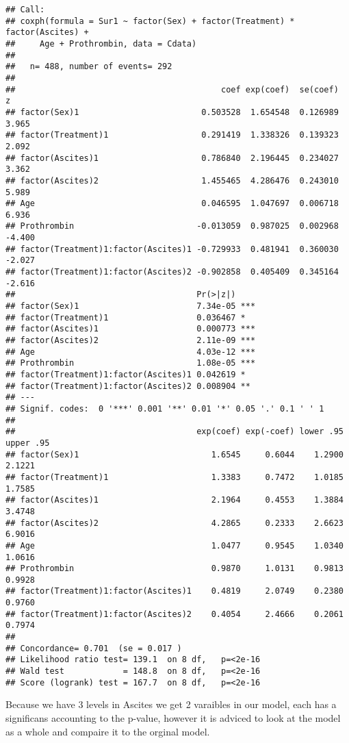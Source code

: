 \documentclass[
]{article}
\begin{document}
\begin{verbatim}
## Call:
## coxph(formula = Sur1 ~ factor(Sex) + factor(Treatment) * factor(Ascites) + 
##     Age + Prothrombin, data = Cdata)
## 
##   n= 488, number of events= 292 
## 
##                                          coef exp(coef)  se(coef)      z
## factor(Sex)1                         0.503528  1.654548  0.126989  3.965
## factor(Treatment)1                   0.291419  1.338326  0.139323  2.092
## factor(Ascites)1                     0.786840  2.196445  0.234027  3.362
## factor(Ascites)2                     1.455465  4.286476  0.243010  5.989
## Age                                  0.046595  1.047697  0.006718  6.936
## Prothrombin                         -0.013059  0.987025  0.002968 -4.400
## factor(Treatment)1:factor(Ascites)1 -0.729933  0.481941  0.360030 -2.027
## factor(Treatment)1:factor(Ascites)2 -0.902858  0.405409  0.345164 -2.616
##                                     Pr(>|z|)    
## factor(Sex)1                        7.34e-05 ***
## factor(Treatment)1                  0.036467 *  
## factor(Ascites)1                    0.000773 ***
## factor(Ascites)2                    2.11e-09 ***
## Age                                 4.03e-12 ***
## Prothrombin                         1.08e-05 ***
## factor(Treatment)1:factor(Ascites)1 0.042619 *  
## factor(Treatment)1:factor(Ascites)2 0.008904 ** 
## ---
## Signif. codes:  0 '***' 0.001 '**' 0.01 '*' 0.05 '.' 0.1 ' ' 1
## 
##                                     exp(coef) exp(-coef) lower .95 upper .95
## factor(Sex)1                           1.6545     0.6044    1.2900    2.1221
## factor(Treatment)1                     1.3383     0.7472    1.0185    1.7585
## factor(Ascites)1                       2.1964     0.4553    1.3884    3.4748
## factor(Ascites)2                       4.2865     0.2333    2.6623    6.9016
## Age                                    1.0477     0.9545    1.0340    1.0616
## Prothrombin                            0.9870     1.0131    0.9813    0.9928
## factor(Treatment)1:factor(Ascites)1    0.4819     2.0749    0.2380    0.9760
## factor(Treatment)1:factor(Ascites)2    0.4054     2.4666    0.2061    0.7974
## 
## Concordance= 0.701  (se = 0.017 )
## Likelihood ratio test= 139.1  on 8 df,   p=<2e-16
## Wald test            = 148.8  on 8 df,   p=<2e-16
## Score (logrank) test = 167.7  on 8 df,   p=<2e-16
\end{verbatim}

Because we have 3 levels in Ascites we get 2 varaibles in our model,
each has a significans accounting to the p-value, however it is adviced
to look at the model as a whole and compaire it to the orginal model.
\end{document}
